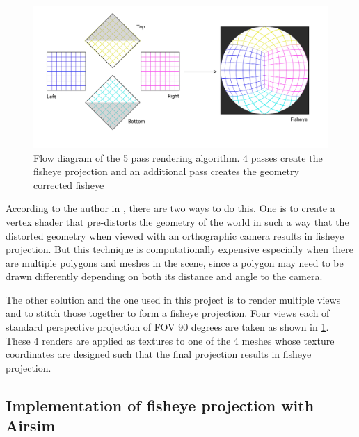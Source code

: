 \documentclass[a4paper, 12pt, oneside, BCOR1cm,toc=chapterentrywithdots]{scrbook}
\begin{document}
\begin{figure}[h]
\centering
\includegraphics[width=1\textwidth]{fisheyestitch.png}
\caption{Flow diagram of the 5 pass rendering algorithm. 4 passes create the fisheye projection and an additional pass creates the geometry corrected fisheye \cite{bourke2009idome}}
\label{fisheyestitch}
\end{figure}

According to the author in  \cite{bourke2009idome}, there are two ways to do this. One is to create a vertex shader that pre-distorts the geometry of the world in such a way that the distorted geometry when viewed with an orthographic camera results in fisheye projection. But this technique is computationally expensive especially when there are multiple polygons and meshes in the scene, since a polygon may need to be drawn differently depending on both its distance and angle to the camera. 

The other solution and the one used in this project is to render multiple views and to stitch those together to form a fisheye projection. Four views each of standard perspective projection of FOV 90 degrees are taken as shown in \ref{fisheyestitch}. These 4 renders are applied as textures to one of the 4 meshes whose texture coordinates are designed such that the final projection results in fisheye projection.






\subsection{Implementation of fisheye projection with Airsim}
\end{document}
